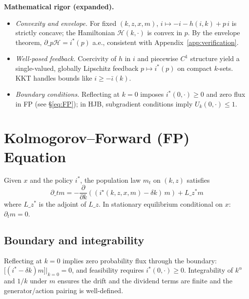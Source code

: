 \documentclass[11pt,letterpaper,oneside]{article}
\numberwithin{equation}{section}
\newcommand{\1}{\mathbf{1}}
\newcommand{\Lz}{L\_z}
\newcommand{\Lzadj}{L\_z^{\!*}}
\newcommand{\kbar}{\bar\iota}
\begin{document}
\begin{tcolorbox}[mathstyle]
\textbf{Mathematical rigor (expanded).}
\begin{itemize}[leftmargin=1.15em,itemsep=0.25em]
  \item \emph{Convexity and envelope.} For fixed $(k,z,x,m)$, $i\mapsto -i-h(i,k)+p\,i$ is strictly concave; the Hamiltonian $\mathcal H(k,\cdot)$ is convex in $p$. By the envelope theorem, $\partial\_p\mathcal H=i^*(p)$ a.e., consistent with Appendix~\ref{app:verification}.
  \item \emph{Well-posed feedback.} Coercivity of $h$ in $i$ and piecewise $C^1$ structure yield a single-valued, globally Lipschitz feedback $p\mapsto i^*(p)$ on compact $k$-sets. KKT handles bounds like $i\ge-\kbar(k)$.
  \item \emph{Boundary conditions.} Reflecting at $k=0$ imposes $i^*(0,\cdot)\ge0$ and zero flux in FP (see \S\ref{eq:FP}); in HJB, subgradient conditions imply $U_k(0,\cdot)\le1$.
\end{itemize}
\end{tcolorbox}

\section{Kolmogorov--Forward (FP) Equation}

Given $x$ and the policy $i^*$, the population law $m_t$ on $(k,z)$ satisfies
\begin{equation}
\partial\_t m = -\frac{\partial}{\partial k}\left((i^\star(k,z,x,m)-\delta k)\, m\right) + \Lzadj m
\tag{FP}\label{eq:FP}
\end{equation}
where $\Lzadj$ is the adjoint of $\Lz$. In stationary equilibrium conditional on $x$: $\partial_t m=0$.

\subsection{Boundary and integrability}
Reflecting at $k=0$ implies zero probability flux through the boundary:
$\big[(i^*-\delta k)m\big]\big|_{k=0}=0$,
and feasibility requires $i^*(0,\cdot)\ge 0$. Integrability of $k^\alpha$ and $1/k$ under $m$ ensures the drift and the dividend terms are finite and the generator/action pairing is well-defined.
\end{document}
